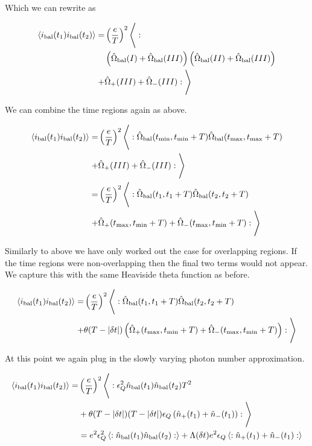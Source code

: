 \documentclass[12pt]{article}
\begin{document}
Which we can rewrite as

\begin{align}
\Braket{i_{\text{bal}}(t_1)i_{\text{bal}}(t_2)} =& \left(\frac{e}{T}\right)^2 \Bigg \langle:\\
&\left(\hat{\Omega}_{\text{bal}}(I) + \hat{\Omega}_{\text{bal}}(III) \right)\left(\hat{\Omega}_{\text{bal}}(II) + \hat{\Omega}_{\text{bal}}(III)  \right)\\
+&\hat{\Omega}_+(III) + \hat{\Omega}_-(III)
:\Bigg \rangle
\end{align}

We can combine the time regions again as above.

\begin{align}
\Braket{i_{\text{bal}}(t_1)i_{\text{bal}}(t_2)} =& \left(\frac{e}{T}\right)^2 \Bigg \langle: \hat{\Omega}_{\text{bal}}(t_{\text{min}},t_{\text{min}}+T) \hat{\Omega}_{\text{bal}}(t_{\text{max}},t_{\text{max}}+T) \\
+&\hat{\Omega}_+(III) + \hat{\Omega}_-(III)
:\Bigg \rangle\\
=& \left(\frac{e}{T}\right)^2 \Bigg \langle: \hat{\Omega}_{\text{bal}}(t_1,t_1+T) \hat{\Omega}_{\text{bal}}(t_2,t_2+T) \\
+&\hat{\Omega}_+(t_{\text{max}},t_{\text{min}}+T) + \hat{\Omega}_-(t_{\text{max}},t_{\text{min}}+T)
:\Bigg \rangle
\end{align}

Similarly to above we have only worked out the case for overlapping regions. If the time regions were non-overlapping then the final two terms would not appear. We capture this with the same Heaviside theta function as before.

\begin{align}
\Braket{i_{\text{bal}}(t_1)i_{\text{bal}}(t_2)} =& 
\left(\frac{e}{T}\right)^2 \Bigg \langle: \hat{\Omega}_{\text{bal}}(t_1,t_1+T) \hat{\Omega}_{\text{bal}}(t_2,t_2+T) \\
+&\theta(T-|\delta t|)\left(\hat{\Omega}_+(t_{\text{max}},t_{\text{min}}+T) + \hat{\Omega}_-(t_{\text{max}},t_{\text{min}}+T)\right)
:\Bigg \rangle
\end{align}

At this point we again plug in the slowly varying photon number approximation.

\begin{align}
\Braket{i_{\text{bal}}(t_1)i_{\text{bal}}(t_2)} = &\left(\frac{e}{T}\right)^2 \Bigg \langle: \epsilon_Q^2 \hat{n}_{\text{bal}}(t_1) \hat{n}_{\text{bal}}(t_2) T^2\\
&+\theta(T-|\delta t|)(T-|\delta t|)\epsilon_Q\left( \hat{n}_+(t_1) + \hat{n}_-(t_1)\right) :\Bigg \rangle\\
&=  e^2\epsilon_Q^2 \Braket{:\hat{n}_{\text{bal}}(t_1) \hat{n}_{\text{bal}}(t_2) :} + \Lambda(\delta t)e^2\epsilon_Q \Braket{: \hat{n}_+(t_1) + \hat{n}_-(t_1):}\\
\end{align}
\end{document}
